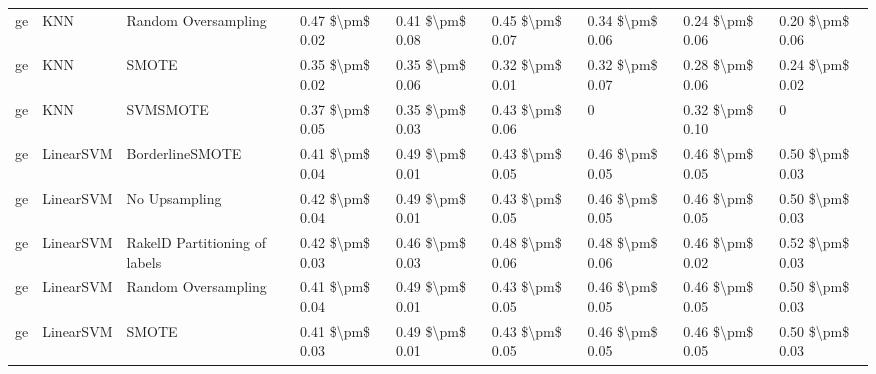 \begin{tabular}{lllllllll}
      ge &                             KNN &           Random Oversampling & 0.47 \$\textbackslash pm\$ 0.02 &           0.41 \$\textbackslash pm\$ 0.08 &       0.45 \$\textbackslash pm\$ 0.07 &        0.34 \$\textbackslash pm\$ 0.06 &                         0.24 \$\textbackslash pm\$ 0.06 &     0.20 \$\textbackslash pm\$ 0.06 \\
      ge &                             KNN &                         SMOTE & 0.35 \$\textbackslash pm\$ 0.02 &           0.35 \$\textbackslash pm\$ 0.06 &       0.32 \$\textbackslash pm\$ 0.01 &        0.32 \$\textbackslash pm\$ 0.07 &                         0.28 \$\textbackslash pm\$ 0.06 &     0.24 \$\textbackslash pm\$ 0.02 \\
      ge &                             KNN &                      SVMSMOTE & 0.37 \$\textbackslash pm\$ 0.05 &           0.35 \$\textbackslash pm\$ 0.03 &       0.43 \$\textbackslash pm\$ 0.06 &                      0 &                         0.32 \$\textbackslash pm\$ 0.10 &                   0 \\
      ge &                       LinearSVM &               BorderlineSMOTE & 0.41 \$\textbackslash pm\$ 0.04 &           0.49 \$\textbackslash pm\$ 0.01 &       0.43 \$\textbackslash pm\$ 0.05 &        0.46 \$\textbackslash pm\$ 0.05 &                         0.46 \$\textbackslash pm\$ 0.05 &     0.50 \$\textbackslash pm\$ 0.03 \\
      ge &                       LinearSVM &                 No Upsampling & 0.42 \$\textbackslash pm\$ 0.04 &           0.49 \$\textbackslash pm\$ 0.01 &       0.43 \$\textbackslash pm\$ 0.05 &        0.46 \$\textbackslash pm\$ 0.05 &                         0.46 \$\textbackslash pm\$ 0.05 &     0.50 \$\textbackslash pm\$ 0.03 \\
      ge &                       LinearSVM & RakelD Partitioning of labels & 0.42 \$\textbackslash pm\$ 0.03 &           0.46 \$\textbackslash pm\$ 0.03 &       0.48 \$\textbackslash pm\$ 0.06 &        0.48 \$\textbackslash pm\$ 0.06 &                         0.46 \$\textbackslash pm\$ 0.02 &     0.52 \$\textbackslash pm\$ 0.03 \\
      ge &                       LinearSVM &           Random Oversampling & 0.41 \$\textbackslash pm\$ 0.04 &           0.49 \$\textbackslash pm\$ 0.01 &       0.43 \$\textbackslash pm\$ 0.05 &        0.46 \$\textbackslash pm\$ 0.05 &                         0.46 \$\textbackslash pm\$ 0.05 &     0.50 \$\textbackslash pm\$ 0.03 \\
      ge &                       LinearSVM &                         SMOTE & 0.41 \$\textbackslash pm\$ 0.03 &           0.49 \$\textbackslash pm\$ 0.01 &       0.43 \$\textbackslash pm\$ 0.05 &        0.46 \$\textbackslash pm\$ 0.05 &                         0.46 \$\textbackslash pm\$ 0.05 &     0.50 \$\textbackslash pm\$ 0.03 \\

\end{tabular}
